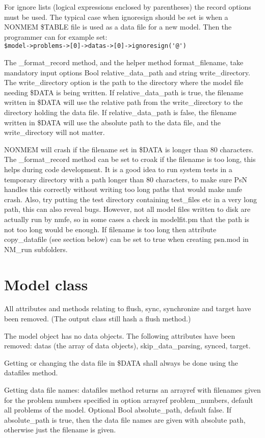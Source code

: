 For ignore lists (logical expressions enclosed by parentheses) the record options must be used.
The typical case when ignoresign should be set is when a NONMEM \$TABLE file is used as a data file for 
a new model. Then the programmer can for example set:\\ \verb|$model->problems->[0]->datas->[0]->ignoresign('@')|

The \_format\_record method, and the helper method format\_filename, take mandatory input options Bool relative\_data\_path and
string write\_directory. 
The write\_directory option is the path to the directory where the model file needing \$DATA is being written.
If relative\_data\_path is true, the filename written in \$DATA will use the relative path from the write\_directory to the
directory holding the data file. If relative\_data\_path is false, the filename written in \$DATA will use the absolute
path to the data file, and the write\_directory will not matter.

NONMEM will crash if the filename set in \$DATA is longer than 80 characters. The \_format\_record method can
be set to croak if the filename is too long, this helps during code development. It is a good idea to run system tests in
a temporary directory with a path longer than 80 characters, to make sure PsN handles this correctly without
writing too long paths that would make nmfe crash. Also, try putting the test directory containing test\_files
etc in a very long path, this can also reveal bugs.
However, not all model files written to disk are actually run by nmfe, so in some cases
a check in modelfit.pm that the path is not too long would be enough. 
If filename is too long then attribute copy\_datafile (see section below) can be set to true when creating psn.mod in NM\_run
subfolders.

\section{Model class}

All attributes and methods relating to flush, sync, synchronize and target have been removed. (The output class still hash a flush method.)

The model object has no data objects. 
The following attributes have been removed: datas (the array of data objects), skip\_data\_parsing, synced, target.

Getting or changing the data file in \$DATA shall always be done using the datafiles method.

Getting data file names: datafiles method returns an arrayref with filenames given for the problem numbers specified in option arrayref problem\_numbers,
default all problems of the model. Optional Bool absolute\_path, default false. If absolute\_path is true, then the data file names
are given with absolute path, otherwise just the filename is given. 

